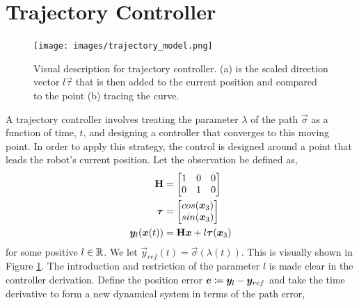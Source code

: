 \documentclass[oneside, 11pt]{book}
\begin{document}
\section{Trajectory Controller}\label{sec:trajectory}
\begin{figure}[!htbp]
    \centering
    \texttt{[image: images/trajectory\_model.png]}
    \caption{Visual description for trajectory controller. (a) is the scaled direction vector $l\vec{\tau}$ that is then added to the current position and compared to the point (b) tracing the curve.}
    \label{fig:basic_traj_vis}
\end{figure}
A trajectory controller involves treating the parameter $\lambda$ of the path $\vec{\sigma}$ as a function of time, $t$, and designing a controller that converges to this moving point. In order to apply this strategy, the control is designed around a point that leads the robot's current position. Let the observation be defined as,
\begin{align*}
    \mathbf{H} &= \begin{bmatrix} 1 & 0 & 0 \\ 0 & 1 & 0 \end{bmatrix}\\
    \bm{\tau} &= \begin{bmatrix} cos(\bm{x}_3) \\ sin(\bm{x}_3) \end{bmatrix} \\
    \bm{y}_l(\bm{x}(t)) &= \mathbf{H}\bm{x} + l\bm{\tau}(\bm{x}_3)
\end{align*}
for some positive $l\in\mathbb{R}$. We let $\vec{y}_{ref}(t) = \vec{\sigma}\left(\lambda(t)\right)$. This is visually shown in Figure \ref{fig:basic_traj_vis}. The introduction and restriction of the parameter $l$ is made clear in the controller derivation. Define the position error $\bm{e} \coloneqq \bm{y}_l - \bm{y}_{ref}$ and take the time derivative to form a new dynamical system in terms of the path error,
\end{document}
